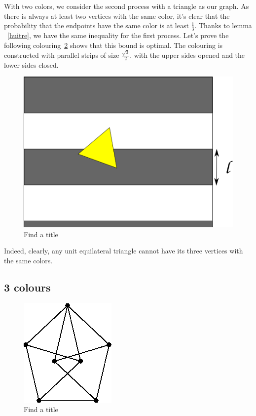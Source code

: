 \documentclass[a4paper,11pt]{article}
\theoremstyle{definition}
\theoremstyle{remark}
\begin{document}
With two colors, we consider the second process with a triangle as our graph. As there is always
 at least two vertices with the same color, it's clear that the 
probability that the endpoints have the same color is at least $\frac{1}{3}$. Thanks to lemma ~\ref{huitre}, we have the same inequality for the first process.
Let's prove the following colouring~\ref{color} shows that this bound is optimal. 
The colouring is constructed with parallel strips of size $\frac {\sqrt3}
2.$ with the upper sides opened and the lower sides closed.   
\begin{figure}[h]
\center
\includegraphics[scale=0.5]{path6509.png}
\caption{\label{color} Find a title}
\end{figure}

Indeed, clearly, any unit equilateral triangle cannot have its three vertices
with the same colors.

\subsection{3 colours}
\begin{figure}[h]
\center
\includegraphics[scale=0.4]{T.png}
\caption{\label{color} Find a title}
\end{figure}
\end{document}
